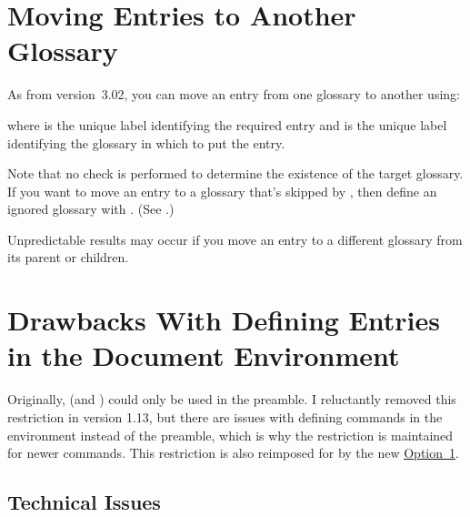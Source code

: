\documentclass[report,inlinetitle]{nlctdoc}
\newcommand*{\opt}[1]{\hyperlink{option#1}{Option~#1}}
\begin{document}
\section{Moving Entries to Another Glossary}
\label{sec:moveentry}

As from version~3.02, you can move an entry from one glossary to
another using:
\begin{definition}[\DescribeMacro{\glsmoveentry}]
\end{definition}
where  is the unique label identifying the required
entry and  is the unique label
identifying the glossary in which to put the entry.

Note that no check is performed to determine the existence of
the target glossary. If you want to move an entry to a glossary
that's skipped by , then define an ignored
glossary with . (See
.)

\begin{important}
Unpredictable results may occur if you move an entry to a different
glossary from its parent or children.
\end{important}

\section{Drawbacks With Defining Entries in the Document Environment}
\label{sec:docdefs}

Originally,  (and ) could only be 
used in the preamble. I reluctantly removed this restriction in version 1.13,
but there are issues with defining commands in the 
environment instead of the preamble, which is why the restriction is
maintained for newer commands. This restriction is also reimposed
for  by the new \opt1.

\subsection{Technical Issues}
\label{sec:techissues}
\end{document}
